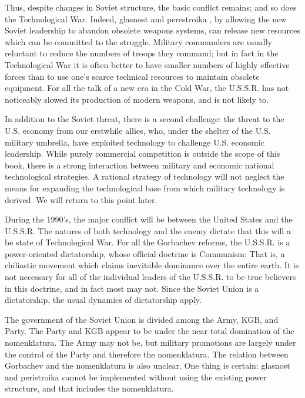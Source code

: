 Thus, despite changes in Soviet structure, the basic conflict remains; and so does the Technological War. Indeed, glasnost and perestroika , by allowing the new Soviet leadership to abandon obsolete weapons systems, can release new resources which can be committed to the struggle. Military commanders are usually reluctant to reduce the numbers of troops they command; but in fact in the Technological War it is often better to have smaller numbers of highly effective forces than to use one's scarce technical resources to maintain obsolete equipment. For all the talk of a new era in the Cold War, the U.S.S.R. has not noticeably slowed its production of modern weapons, and is not likely to.

In addition to the Soviet threat, there is a second challenge: the threat to the U.S. economy from our erstwhile allies, who, under the shelter of the U.S. military umbrella, have exploited technology to challenge U.S. economic leadership. While purely commercial competition is outside the scope of this book, there is a strong interaction between military and economic national technological strategies. A rational strategy of technology will not neglect the means for expanding the technological base from which military technology is derived. We will return to this point later.

During the 1990's, the major conflict will be between the United States and the U.S.S.R. The natures of both technology and the enemy dictate that this will a be state of Technological War. For all the Gorbachev reforms, the U.S.S.R. is a power-oriented dictatorship, whose official doctrine is Communism: That is, a chiliastic movement which claims inevitable dominance over the entire earth. It is not necessary for all of the individual leaders of the U.S.S.R. to be true believers in this doctrine, and in fact most may not. Since the Soviet Union is a dictatorship, the usual dynamics of dictatorship apply.

The government of the Soviet Union is divided among the Army, KGB, and Party. The Party and KGB appear to be under the near total domination of the nomenklatura. The Army may not be, but military promotions are largely under the control of the Party and therefore the nomenklatura. The relation between Gorbachev and the nomenklatura is also unclear. One thing is certain: glasnost and peristroika cannot be implemented without using the existing power structure, and that includes the nomenklatura.

